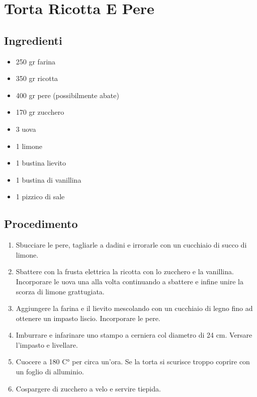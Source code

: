 \section{Torta Ricotta E Pere}
\subsection{Ingredienti}
\begin{itemize}
\item 250 gr farina  
\item 350 gr ricotta  
\item 400 gr pere (possibilmente abate)  
\item 170 gr zucchero  
\item 3 uova  
\item 1 limone  
\item 1 bustina lievito  
\item 1 bustina di vanillina  
\item 1 pizzico di sale
\end{itemize}
\subsection{Procedimento}
\begin{enumerate}
\item  Sbucciare le pere, tagliarle a dadini e irrorarle con un cucchiaio di succo di limone.  
\item  Sbattere con la frusta elettrica la ricotta con lo zucchero e la vanillina. Incorporare le uova una alla volta continuando a sbattere e infine unire la scorza di limone grattugiata.  
\item  Aggiungere la farina e il lievito mescolando con un cucchiaio di legno fino ad ottenere un impasto liscio. Incorporare le pere.  
\item  Imburrare e infarinare uno stampo a cerniera col diametro di 24 cm. Versare l'impasto e livellare.  
\item  Cuocere a 180 C° per circa un'ora. Se la torta si scurisce troppo coprire con un foglio di alluminio.  
\item  Cospargere di zucchero a velo e servire tiepida.
\end{enumerate}
